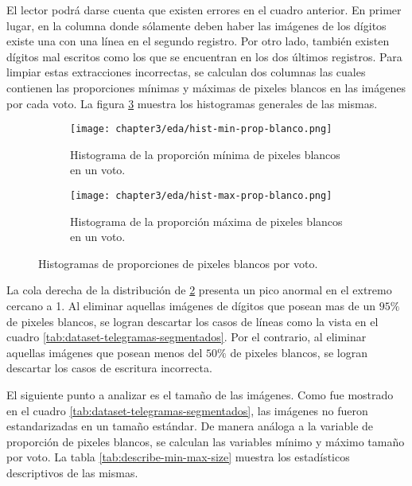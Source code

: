 El lector podr\'a darse cuenta que existen errores en el cuadro anterior. En primer lugar, en la columna donde
s\'olamente deben haber las im\'agenes de los d\'igitos existe una con una l\'inea en el segundo registro. Por otro
lado, tambi\'en existen d\'igitos mal escritos como los que se encuentran en los dos \'ultimos registros. Para limpiar
estas extracciones incorrectas, se calculan dos columnas las cuales contienen las proporciones m\'inimas y m\'aximas de
pixeles blancos en las im\'agenes por cada voto. La figura \ref{fig:histogramas-min-max-prop-blanco} muestra los
histogramas generales de las mismas.

\begin{figure}[H]
    \centering
    \begin{subfigure}[h]{0.48\textwidth}
        \texttt{[image: chapter3/eda/hist-min-prop-blanco.png]}
        \caption{Histograma de la proporci\'on m\'inima de pixeles blancos en un voto.}
        \label{fig:histograma-min-prop-blanco}
    \end{subfigure}
    \hfill
    \begin{subfigure}[h]{0.48\textwidth}
        \texttt{[image: chapter3/eda/hist-max-prop-blanco.png]}
        \caption{Histograma de la proporci\'on m\'axima de pixeles blancos en un voto.}
        \label{fig:histograma-max-prop-blanco}
    \end{subfigure}
    \caption{Histogramas de proporciones de pixeles blancos por voto.}
    \label{fig:histogramas-min-max-prop-blanco}
\end{figure}

La cola derecha de la distribuci\'on de \ref{fig:histograma-max-prop-blanco} presenta un pico anormal en el extremo
cercano a 1. Al eliminar aquellas im\'agenes de d\'igitos que posean mas de un $95\%$ de pixeles blancos, se logran
descartar los casos de l\'ineas como la vista en el cuadro \ref{tab:dataset-telegramas-segmentados}. Por el contrario,
al eliminar aquellas im\'agenes que posean menos del $50\%$ de pixeles blancos, se logran descartar los casos de
escritura incorrecta.

El siguiente punto a analizar es el tama\~{n}o de las im\'agenes. Como fue mostrado en el cuadro
\ref{tab:dataset-telegramas-segmentados}, las im\'agenes no fueron estandarizadas en un tama\~{n}o est\'andar. De
manera an\'aloga a la variable de proporci\'on de pixeles blancos, se calculan las variables m\'inimo y m\'aximo
tama\~{n}o por voto. La tabla \ref{tab:describe-min-max-size} muestra los estad\'isticos descriptivos de las mismas.

